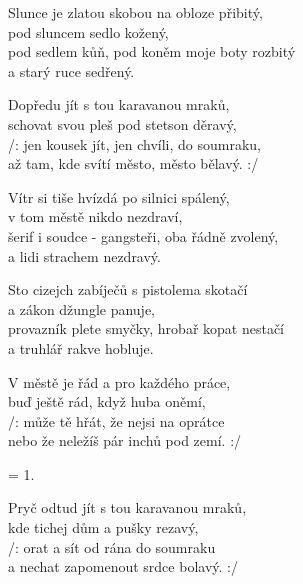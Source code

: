 
\ve{}
Slunce je zlatou skobou na obloze přibitý, \\
pod sluncem sedlo kožený,  \\
pod sedlem kůň, pod koněm moje boty rozbitý \\
a starý ruce sedřený. 

\cho{}
Dopředu jít s tou karavanou mraků, \\
schovat svou pleš pod stetson děravý, \\
/: jen kousek jít, jen chvíli, do soumraku, \\
až tam, kde svítí město, město bělavý. :/ 

\ve{}
Vítr si tiše hvízdá po silnici spálený, \\
v tom městě nikdo nezdraví, \\
šerif i soudce - gangsteři, oba řádně zvolený, \\
a lidi strachem nezdravý. 

\ve{}
Sto cizejch zabíječů s pistolema skotačí \\
a zákon džungle panuje, \\
provazník plete smyčky, hrobař kopat nestačí \\
a truhlář rakve hobluje. 

\cho{}
V městě je řád a pro každého práce, \\
buď ještě rád, když huba oněmí, \\
/: může tě hřát, že nejsi na oprátce \\
nebo že neležíš pár inchů pod zemí. :/ 

\ve{}
= 1. 


\cho{}
Pryč odtud jít s tou karavanou mraků, \\
kde tichej dům a pušky rezavý, \\
/: orat a sít od rána do soumraku \\
a nechat zapomenout srdce bolavý. :/ 

\esong{}